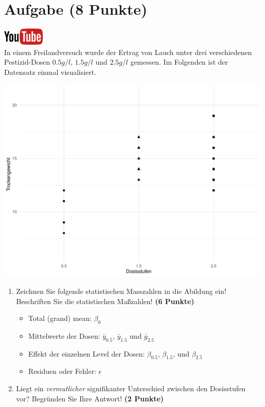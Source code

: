 \documentclass[a4paper, 9pt]{scrartcl}\usepackage[]{graphicx}\usepackage[]{xcolor}
\makeatletter
\def\maxwidth{ %
  \ifdim\Gin@nat@width>\linewidth
    \linewidth
  \else
    \Gin@nat@width
  \fi
}
\newenvironment{knitrout}{}{} %
\makeatother
\begin{document}
\section{Aufgabe \hfill (8 Punkte)}

\hfill\href{https://youtu.be/Q7xtQJoOmQI}{\includegraphics[width =
  2cm]{img/youtube}}\\[1Ex]



In einem Freilandversuch wurde der Ertrag von Lauch unter drei verschiedenen
Pestizid-Dosen $0.5 g/l$, $1.5 g/l$ und $2.5 g/l$ gemessen. Im Folgenden ist der
Datensatz einmal visualisiert.

\begin{knitrout}
\color{fgcolor}

{\centering \includegraphics[width=\maxwidth]{img/anova-01-a-1} 

}


\end{knitrout}

\begin{enumerate}
\item Zeichnen Sie folgende statistischen Masszahlen in die Abildung ein!
  Beschriften Sie die statistischen Ma{\ss}zahlen! \textbf{(6 Punkte)}
  \begin{itemize}
  \item Total (grand) mean: $\beta_0$
  \item Mittelwerte der Dosen: $\bar{y}_{0.5}$, $\bar{y}_{1.5}$ und $\bar{y}_{2.5}$
  \item Effekt der einzelnen Level der Dosen: $\beta_{0.5}$, $\beta_{1.5}$,
    und $\beta_{2.5}$
  \item Residuen oder Fehler: $\epsilon$
  \end{itemize}
\item Liegt ein \textit{vermutlicher} signifikanter Unterschied zwischen
  den Dosisstufen vor? Begr{\"u}nden Sie Ihre Antwort! \textbf{(2 Punkte)}
\end{enumerate}
 
\end{document}
